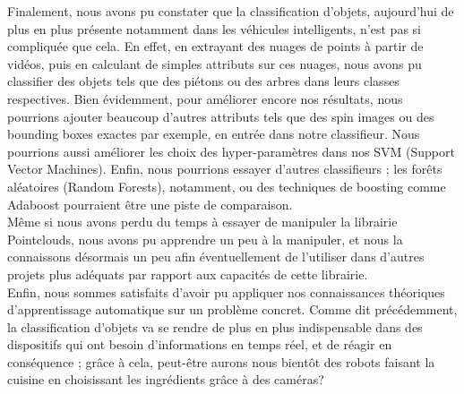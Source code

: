 Finalement, nous avons pu constater que la classification d'objets, aujourd'hui de plus en plus présente notamment dans les véhicules intelligents, n'est pas si compliquée que cela. En effet, en extrayant des nuages de points à partir de vidéos, puis en calculant de simples attributs sur ces nuages, nous avons pu classifier des objets tels que des piétons ou des arbres dans leurs classes respectives. Bien évidemment, pour améliorer encore nos résultats, nous pourrions ajouter beaucoup d'autres attributs tels que des spin images ou des bounding boxes exactes par exemple, en entrée dans notre classifieur. Nous pourrions aussi améliorer les choix des hyper-paramètres dans nos SVM (Support Vector Machines). Enfin, nous pourrions essayer d'autres classifieurs ; les forêts aléatoires (Random Forests), notamment, ou des techniques de boosting comme Adaboost pourraient être une piste de comparaison.\\

Même si nous avons perdu du temps à essayer de manipuler la librairie Pointclouds, nous avons pu apprendre un peu à la manipuler, et nous la connaissons désormais un peu afin éventuellement de l'utiliser dans d'autres projets plus adéquats par rapport aux capacités de cette librairie.\\

Enfin, nous sommes satisfaits d'avoir pu appliquer nos connaissances théoriques d'apprentissage automatique sur un problème concret. Comme dit précédemment, la classification d'objets va se rendre de plus en plus indispensable dans des dispositifs qui ont besoin d'informations en temps réel, et de réagir en conséquence ; grâce à cela, peut-être aurons nous bientôt des robots faisant la cuisine en choisissant les ingrédients grâce à des caméras?\\
